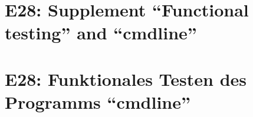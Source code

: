 
\thispagestyle{empty}
\ifenglish
\section*{E28: Supplement ``Functional testing'' and ``cmdline''}

\fi
\ifgerman
\section*{E28: Funktionales Testen des Programms "`cmdline"'}

\fi

